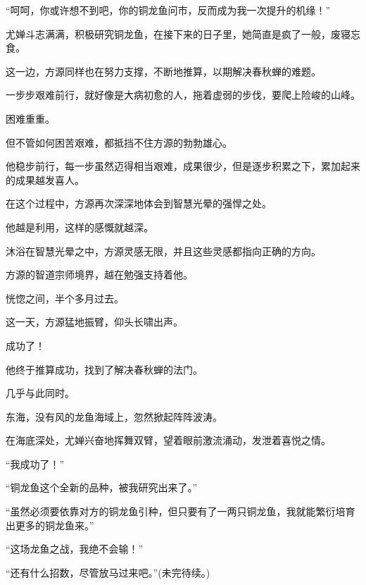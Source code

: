 \begin{this_body}
“呵呵，你或许想不到吧，你的铜龙鱼问市，反而成为我一次提升的机缘！”

尤婵斗志满满，积极研究铜龙鱼，在接下来的日子里，她简直是疯了一般，废寝忘食。

这一边，方源同样也在努力支撑，不断地推算，以期解决春秋蝉的难题。

一步步艰难前行，就好像是大病初愈的人，拖着虚弱的步伐，要爬上险峻的山峰。

困难重重。

但不管如何困苦艰难，都抵挡不住方源的勃勃雄心。

他稳步前行，每一步虽然迈得相当艰难，成果很少，但是逐步积累之下，累加起来的成果越发喜人。

在这个过程中，方源再次深深地体会到智慧光晕的强悍之处。

他越是利用，这样的感慨就越深。

沐浴在智慧光晕之中，方源灵感无限，并且这些灵感都指向正确的方向。

方源的智道宗师境界，越在勉强支持着他。

恍惚之间，半个多月过去。

这一天，方源猛地振臂，仰头长啸出声。

成功了！

他终于推算成功，找到了解决春秋蝉的法门。

几乎与此同时。

东海，没有风的龙鱼海域上，忽然掀起阵阵波涛。

在海底深处，尤婵兴奋地挥舞双臂，望着眼前激流涌动，发泄着喜悦之情。

“我成功了！”

“铜龙鱼这个全新的品种，被我研究出来了。”

“虽然必须要依靠对方的铜龙鱼引种，但只要有了一两只铜龙鱼，我就能繁衍培育出更多的铜龙鱼来。”

“这场龙鱼之战，我绝不会输！”

“还有什么招数，尽管放马过来吧。”(未完待续。)

\end{this_body}

